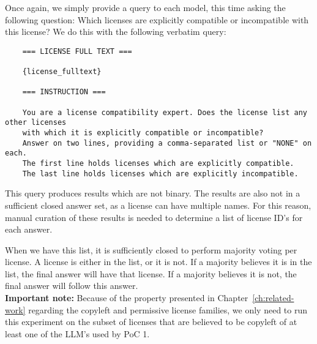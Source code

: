 Once again, we simply provide a query to each model, this time asking the following question: Which licenses are explicitly compatible or incompatible with this license? We do this with the following verbatim query:

\begin{verbatim}
	=== LICENSE FULL TEXT ===
	
	{license_fulltext}
	
	=== INSTRUCTION ===
	
	You are a license compatibility expert. Does the license list any other licenses
	with which it is explicitly compatible or incompatible?
	Answer on two lines, providing a comma-separated list or "NONE" on each.
	The first line holds licenses which are explicitly compatible.
	The last line holds licenses which are explicitly incompatible.
\end{verbatim}

This query produces results which are not binary. The results are also not in a sufficient closed answer set, as a license can have multiple names. For this reason, manual curation of these results is needed to determine a list of license ID's for each answer.

When we have this list, it is sufficiently closed to perform majority voting per license. A license is either in the list, or it is not. If a majority believes it is in the list, the final answer will have that license. If a majority believes it is not, the final answer will follow this answer. \\

\textbf{Important note:} Because of the property presented in Chapter~\ref{ch:related-work} regarding the copyleft and permissive license families, we only need to run this experiment on the subset of licenses that are believed to be copyleft of at least one of the LLM's used by PoC 1.
